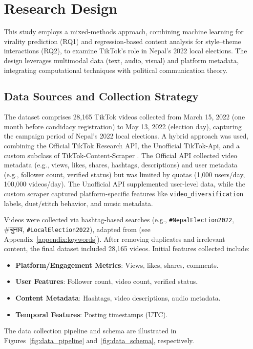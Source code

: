 \documentclass[12pt,a4paper]{report}
\begin{document}

\chapter{Research Design}
This study employs a mixed-methods approach, combining machine learning for virality prediction (RQ1) and regression-based content analysis for style–theme interactions (RQ2), to examine TikTok’s role in Nepal’s 2022 local elections. The design leverages multimodal data (text, audio, visual) and platform metadata, integrating computational techniques with political communication theory.

\section{Data Sources and Collection Strategy}
The dataset comprises 28,165 TikTok videos collected from March 15, 2022 (one month before candidacy registration) to May 13, 2022 (election day), capturing the campaign period of Nepal’s 2022 local elections. A hybrid approach was used, combining the Official TikTok Research API, the Unofficial TikTok-Api, and a custom subclass of TikTok-Content-Scraper \parencite{QBukold2025TikTokScraper}. The Official API collected video metadata (e.g., views, likes, shares, hashtags, descriptions) and user metadata (e.g., follower count, verified status) but was limited by quotas (1,000 users/day, 100,000 videos/day). The Unofficial API supplemented user-level data, while the custom scraper captured platform-specific features like \texttt{video\_diversification} labels, duet/stitch behavior, and music metadata.

Videos were collected via hashtag-based searches (e.g., \texttt{\#NepalElection2022}, \texthindi{\#चुनाव}, \texttt{\#LocalElection2022}), adapted from \parencite{pinto2024} (see Appendix~\ref{appendix:keywords}). After removing duplicates and irrelevant content, the final dataset included 28,165 videos. Initial features collected include:
\begin{itemize}
    \item \textbf{Platform/Engagement Metrics}: Views, likes, shares, comments.
    \item \textbf{User Features}: Follower count, video count, verified status.
    \item \textbf{Content Metadata}: Hashtags, video descriptions, audio metadata.
    \item \textbf{Temporal Features}: Posting timestamps (UTC).
\end{itemize}
The data collection pipeline and schema are illustrated in Figures~\ref{fig:data_pipeline} and~\ref{fig:data_schema}, respectively.
\end{document}
